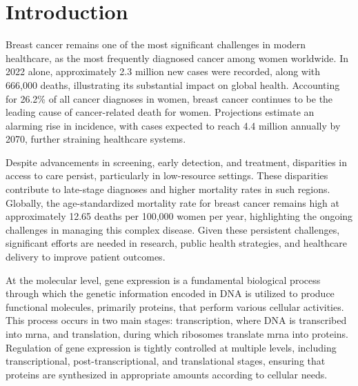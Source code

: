 \chapter{Introduction}

Breast cancer remains one of the most significant challenges in modern
healthcare, as the most frequently diagnosed cancer among women worldwide.
In 2022 alone, approximately 2.3 million new cases were recorded, along with
666,000 deaths, illustrating its substantial impact on global health.
Accounting for 26.2\% of all cancer diagnoses in
women\supercite{bray_global_2024,ferlay_global_2024}, breast cancer continues
to be the leading cause of cancer-related death for women.
Projections estimate an alarming rise in incidence, with cases expected to
reach 4.4 million annually by 2070, further straining healthcare
systems\supercite{lei_global_2021}.

Despite advancements in screening, early detection, and treatment, disparities
in access to care persist, particularly in low-resource settings.
These disparities contribute to late-stage diagnoses and higher mortality rates
in such regions\supercite{wilkinson_understanding_2022,ginsburg_breast_2020}.
Globally, the age-standardized mortality rate for breast cancer remains high at
approximately 12.65 deaths per 100,000 women per year, highlighting the ongoing
challenges in managing this complex
disease\supercite{bray_global_2024,ferlay_global_2024}.
Given these persistent challenges, significant efforts are needed in research,
public health strategies, and healthcare delivery to improve patient
outcomes\supercite{desantis_breast_2019}.

At the molecular level, gene expression is a fundamental biological process
through which the genetic information encoded in DNA is utilized to produce
functional molecules, primarily proteins, that perform various cellular
activities\supercite{salmena_cerna_2011}.
This process occurs in two main stages: transcription, where DNA is transcribed
into \gls{mrna}, and translation, during which ribosomes translate \gls{mrna}
into proteins\supercite{salmena_cerna_2011,tay_multilayered_2014}.
Regulation of gene expression is tightly controlled at multiple levels,
including transcriptional, post-transcriptional, and translational stages,
ensuring that proteins are synthesized in appropriate amounts according to
cellular
needs\supercite{poliseno_coding-independent_2010,tay_multilayered_2014}.

